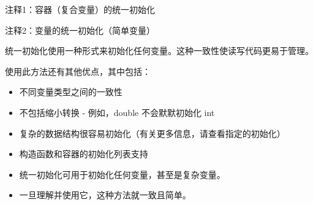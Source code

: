 {\footnotesize
注释1：容器（复合变量）的统一初始化

注释2：变量的统一初始化（简单变量）
}

统一初始化使用一种形式来初始化任何变量。这种一致性使读写代码更易于管理。

使用此方法还有其他优点，其中包括：

\begin{itemize}
\item
不同变量类型之间的一致性

\item
不包括缩小转换 - 例如，double 不会默默初始化 int

\item
复杂的数据结构很容易初始化（有关更多信息，请查看指定的初始化）

\item
构造函数和容器的初始化列表支持
\end{itemize}


\begin{itemize}
\item
统一初始化可用于初始化任何变量，甚至是复杂变量。

\item
一旦理解并使用它，这种方法就一致且简单。
\end{itemize}
